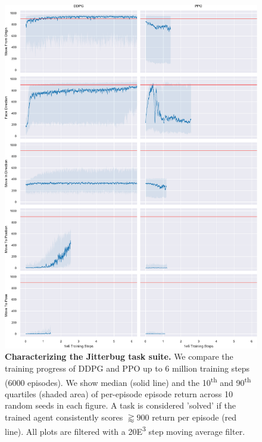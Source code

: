 \documentclass[letterpaper, 10 pt, conference]{ieeeconf}
\begin{document}
\begin{figure}[p]
    
    \centering
    \includegraphics[height=0.94\textheight]{fig-rl-perf}
    
    \caption{
        \textbf{Characterizing the Jitterbug task suite.}
        We compare the training progress of DDPG and PPO up to 6 million training steps (6000 episodes).
        We show median (solid line) and the 10\textsuperscript{th} and 90\textsuperscript{th} quartiles (shaded area) of per-episode episode return across 10 random seeds in each figure.
        A task is considered 'solved' if the trained agent consistently scores $\gtrapprox 900$ return per episode (red line).
        All plots are filtered with a 20{\tiny E}\textsuperscript{3} step moving average filter.
    }
    
    \label{fig:rl-perf}
\end{figure}
\end{document}
